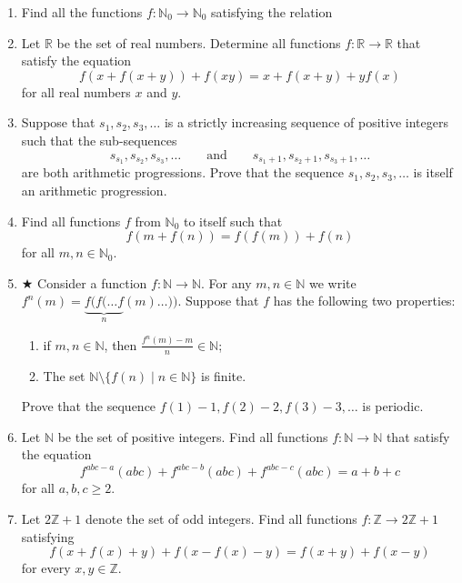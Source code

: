 \begin{enumerate}
    


    \item Find all the functions $f: \mathbb N_0 \to \mathbb N_0$ satisfying the relation

    


    \item Let $\mathbb{R}$ be the set of real numbers. Determine all functions $f: \mathbb{R} \to \mathbb{R}$ that satisfy the equation
    \[f(x + f(x + y)) + f(xy) = x + f(x + y) + yf(x)\]for all real numbers $x$ and $y$.

    


    \item Suppose that $s_1, s_2, s_3, \ldots$ is a strictly increasing sequence of positive integers such that the sub-sequences
    \[s_{s_1}, s_{s_2}, s_{s_3}, \ldots \qquad\text{and}\qquad s_{s_1+1}, s_{s_2+1}, s_{s_3+1}, \ldots\]are both arithmetic progressions. Prove that the sequence $s_1, s_2, s_3, \ldots$ is itself an arithmetic progression.

    


    \item Find all functions $f$ from $\mathbb{N}_0$ to itself such that
    \[f(m + f(n)) = f(f(m)) + f(n)\]for all $m, n \in \mathbb{N}_0$.

    


    \item $ \bigstar $ Consider a function $f: \mathbb{N} \to \mathbb{N}$. For any $m, n \in \mathbb{N}$ we write $f^n(m) = \underbrace{f(f(\ldots f}_{n}(m)\ldots))$. Suppose that $f$ has the following two properties:

\begin{enumerate}

	   


       \item if $m, n \in \mathbb{N}$, then $\frac{f^n(m) - m}{n} \in \mathbb{N}$;
        


        \item The set $\mathbb{N} \setminus \{f(n) \mid n\in \mathbb{N}\}$ is finite.

\end{enumerate}
    
    Prove that the sequence $f(1) - 1, f(2) - 2, f(3) - 3, \ldots$ is periodic.
    
    


    \item Let $\mathbb{N}$ be the set of positive integers. Find all functions $f: \mathbb{N} \to \mathbb{N}$ that satisfy the equation
    \[f^{abc-a}(abc) + f^{abc-b}(abc) + f^{abc-c}(abc) = a + b + c\]for all $a,b,c \ge 2$.

    


    \item Let $2\mathbb{Z} + 1$ denote the set of odd integers. Find all functions $f:\mathbb{Z} \to 2\mathbb{Z} + 1$ satisfying
    \[f(x + f(x) + y) + f(x - f(x) - y) = f(x + y) + f(x - y)\]for every $x, y \in \mathbb{Z}$.

\end{enumerate}